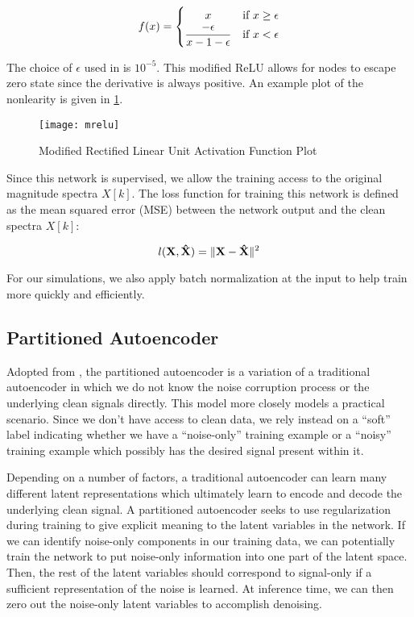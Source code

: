 \begin{equation}\label{eq:mrelu}
f(x) =
    \begin{cases}
        \hfill x \hfill & \text{if $x \ge \epsilon$}\\
        \hfill \dfrac{-\epsilon}{x-1-\epsilon} & \text{if $x < \epsilon$}
    \end{cases}
\end{equation}

The choice of $\epsilon$ used in \cite{liu2014experiments} is $10^{-5}$. This modified ReLU allows for nodes to escape zero state since the derivative is always positive. An example plot of the nonlearity is given in \ref{fig:mrelu}.

\begin{figure}[!ht]
\centering
\texttt{[image: mrelu]}
\caption[Modified Rectified Linear Unit Activation]{Modified Rectified Linear Unit Activation Function Plot}
\label{fig:mrelu}
\end{figure}

Since this network is supervised, we allow the training access to the original magnitude spectra $X[k]$. The loss function for training this network is defined as the mean squared error (MSE) between the network output and the clean spectra $X[k]$:

\begin{equation}
l(\mathbf{X},\mathbf{\hat{X}}) = \lVert\mathbf{X}-\mathbf{\hat{X}}\rVert^{2}
\end{equation}

For our simulations, we also apply batch normalization at the input to help train more quickly and efficiently.

\subsection{Partitioned Autoencoder}

Adopted from \cite{stow}, the partitioned autoencoder is a variation of a traditional autoencoder in which we do not know the noise corruption process or the underlying clean signals directly. This model more closely models a practical scenario. Since we don't have access to clean data, we rely instead on a ``soft'' label indicating whether we have a ``noise-only'' training example or a ``noisy'' training example which possibly has the desired signal present within it.

Depending on a number of factors, a traditional autoencoder can learn many different latent representations which ultimately learn to encode and decode the underlying clean signal. A partitioned autoencoder seeks to use regularization during training to give explicit meaning to the latent variables in the network. If we can identify noise-only components in our training data, we can potentially train the network to put noise-only information into one part of the latent space. Then, the rest of the latent variables should correspond to signal-only if a sufficient representation of the noise is learned. At inference time, we can then zero out the noise-only latent variables to accomplish denoising.

